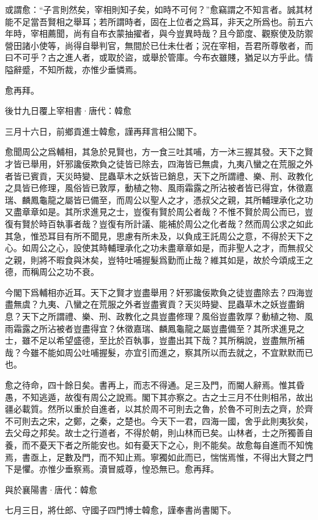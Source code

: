 \documentclass[12pt,a4paper]{ctexbook}
\begin{document}
或謂愈：“子言則然矣，宰相則知子矣，如時不可何？”愈竊謂之不知言者。誠其材能不足當吾賢相之舉耳；若所謂時者，固在上位者之爲耳，非天之所爲也。前五六年時，宰相薦聞，尚有自布衣蒙抽擢者，與今豈異時哉？且今節度、觀察使及防禦營田諸小使等，尚得自舉判官，無間於已仕未仕者；況在宰相，吾君所尊敬者，而曰不可乎？古之進人者，或取於盜，或舉於管庫。今布衣雖賤，猶足以方乎此。情隘辭蹙，不知所裁，亦惟少垂憐焉。\par
愈再拜。\par
後廿九日覆上宰相書·唐代：韓愈 \par
三月十六日，前鄉貢進士韓愈，謹再拜言相公閣下。\par
愈聞周公之爲輔相，其急於見賢也，方一食三吐其哺，方一沐三握其發。天下之賢才皆已舉用，奸邪讒佞欺負之徒皆已除去，四海皆已無虞，九夷八蠻之在荒服之外者皆已賓貢，天災時變、昆蟲草木之妖皆已銷息，天下之所謂禮、樂、刑、政教化之具皆已修理，風俗皆已敦厚，動植之物、風雨霜露之所沾被者皆已得宜，休徵嘉瑞、麟鳳龜龍之屬皆已備至，而周公以聖人之才，憑叔父之親，其所輔理承化之功又盡章章如是。其所求進見之士，豈復有賢於周公者哉？不惟不賢於周公而已，豈復有賢於時百執事者哉？豈復有所計議、能補於周公之化者哉？然而周公求之如此其急，惟恐耳目有所不聞見，思慮有所未及，以負成王託周公之意，不得於天下之心。如周公之心，設使其時輔理承化之功未盡章章如是，而非聖人之才，而無叔父之親，則將不暇食與沐矣，豈特吐哺握髮爲勤而止哉？維其如是，故於今頌成王之德，而稱周公之功不衰。\par
今閣下爲輔相亦近耳。天下之賢才豈盡舉用？奸邪讒佞欺負之徒豈盡除去？四海豈盡無虞？九夷、八蠻之在荒服之外者豈盡賓貢？天災時變、昆蟲草木之妖豈盡銷息？天下之所謂禮、樂、刑、政教化之具豈盡修理？風俗豈盡敦厚？動植之物、風雨霜露之所沾被者豈盡得宜？休徵嘉瑞、麟鳳龜龍之屬豈盡備至？其所求進見之士，雖不足以希望盛德，至比於百執事，豈盡出其下哉？其所稱說，豈盡無所補哉？今雖不能如周公吐哺握髮，亦宜引而進之，察其所以而去就之，不宜默默而已也。\par
愈之待命，四十餘日矣。書再上，而志不得通。足三及門，而閽人辭焉。惟其昏愚，不知逃遁，故復有周公之說焉。閣下其亦察之。古之士三月不仕則相吊，故出疆必載質。然所以重於自進者，以其於周不可則去之魯，於魯不可則去之齊，於齊不可則去之宋，之鄭，之秦，之楚也。今天下一君，四海一國，舍乎此則夷狄矣，去父母之邦矣。故士之行道者，不得於朝，則山林而已矣。山林者，士之所獨善自養，而不憂天下者之所能安也。如有憂天下之心，則不能矣。故愈每自進而不知愧焉，書亟上，足數及門，而不知止焉。寧獨如此而已，惴惴焉惟，不得出大賢之門下是懼。亦惟少垂察焉。瀆冒威尊，惶恐無已。愈再拜。\par
與於襄陽書·唐代：韓愈 \par
七月三日，將仕郎、守國子四門博士韓愈，謹奉書尚書閣下。\par
\end{document}
